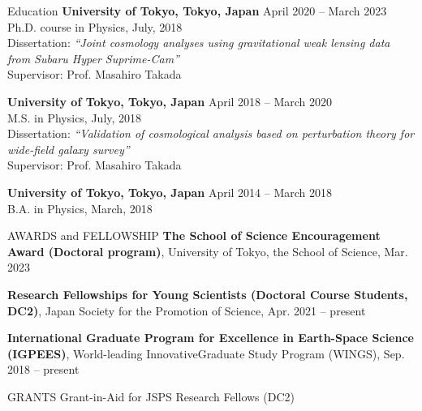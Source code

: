 \documentclass{sty/resume} %
\begin{document}
\begin{rSection}{Education}
{\bf University of Tokyo, Tokyo, Japan}  \hfill {April 2020 -- March 2023}\\
Ph.D. course in Physics, July, 2018\\
Dissertation: \textit{``Joint cosmology analyses using gravitational weak lensing data from Subaru Hyper Suprime-Cam''}\\
Supervisor: Prof. Masahiro Takada

{\bf University of Tokyo, Tokyo, Japan}  \hfill {April 2018 -- March 2020}\\
M.S. in Physics, July, 2018\\
Dissertation: \textit{``Validation of cosmological analysis based on perturbation theory for wide-field galaxy survey''} \\
Supervisor: Prof. Masahiro Takada

{\bf University of Tokyo, Tokyo, Japan}  \hfill {April 2014 -- March 2018}\\
B.A. in Physics, March, 2018

\end{rSection}


\begin{rSection}{AWARDS and FELLOWSHIP}
    \textbf{The School of Science Encouragement Award (Doctoral program)}, University of Tokyo, the School of Science, Mar. 2023
    
    \textbf{Research Fellowships for Young Scientists (Doctoral Course Students, DC2)}, Japan Society for the Promotion of Science, Apr. 2021 -- present

    \textbf{International Graduate Program for Excellence in Earth-Space Science (IGPEES)}, World-leading InnovativeGraduate Study Program (WINGS), Sep. 2018 -- present
\end{rSection}


\begin{rSection}{GRANTS}
    Grant-in-Aid for JSPS Research Fellows (DC2)
\end{rSection}
\end{document}
